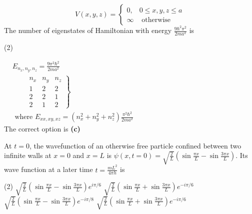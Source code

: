 \begin{enumerate}
\begin{minipage}{\textwidth}
	$$
	V(x, y, z)=\left\{\begin{array}{lc}
	0, & 0 \leq x, y, z \leq a \\
	\infty & \text { otherwise }
	\end{array}\right.
	$$
	The number of eigenstates of Hamiltonian with energy $\frac{9 \hbar^{2} \pi^{2}}{2 m a^{2}}$ is
\end{minipage}
\begin{tasks}(2)
\end{tasks}
\begin{answer}
	$\begin{aligned}
	&E_{n_{x}, n_{y}, n_{z}}=\frac{9 \pi^{2} \hbar^{2}}{2 m a^{2}} \\
	&\left.\qquad \begin{array}{rrr}
	n_{x} & n_{y} & n_{z} \\
	1 & 2 & 2 \\
	2 & 2 & 1 \\
	2 & 1 & 2
	\end{array}\right\} \\
	&\text { where } E_{x x, x y, x z}=\left(n_{x}^{2}+n_{y}^{2}+n_{z}^{2}\right) \frac{\pi^{2} \hbar^{2}}{2 m a^{2}}
	\end{aligned}$\\
	The correct option is \textbf{(c)}
\end{answer}
\begin{minipage}{\textwidth}
	\item At $t=0$, the wavefunction of an otherwise free particle confined between two infinite walls at $x=0$ and $x=L$ is $\psi(x, t=0)=\sqrt{\frac{2}{L}}\left(\sin \frac{\pi x}{L}-\sin \frac{3 \pi x}{L}\right)$. Its wave function at a later time $t=\frac{m L^{2}}{4 \pi h}$ is
\end{minipage}
\begin{tasks}(2)
	\task[\textbf{A.}] $\sqrt{\frac{2}{L}}\left(\sin \frac{\pi x}{L}-\sin \frac{3 \pi x}{L}\right) e^{i \pi / 6}$
	\task[\textbf{B.}]$\sqrt{\frac{2}{L}}\left(\sin \frac{\pi x}{L}+\sin \frac{3 \pi x}{L}\right) e^{-i \pi / 6}$
	\task[\textbf{C.}]$\sqrt{\frac{2}{L}}\left(\sin \frac{\pi x}{L}-\sin \frac{3 \pi x}{L}\right) e^{-i \pi / 8}$
	\task[\textbf{D.}]$\sqrt{\frac{2}{L}}\left(\sin \frac{\pi x}{L}+\sin \frac{3 \pi x}{L}\right) e^{-i \pi / 6}$
\end{tasks}
\begin{answer}
	$\begin{aligned}

\end{aligned}
\end{answer}
\end{enumerate}
